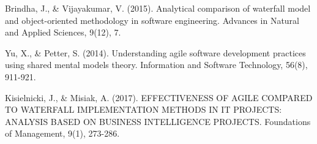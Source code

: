 \documentclass[12pt,a4paper]{article}
\begin{document}
\begin{thebibliography}{9}
  Brindha, J., \& Vijayakumar, V. (2015). Analytical comparison of waterfall model and object-oriented methodology in software engineering. Advances in Natural and Applied Sciences, 9(12), 7.
  
  Yu, X., \& Petter, S. (2014). Understanding agile software development practices using shared mental models theory. Information and Software Technology, 56(8), 911-921.
  
  Kisielnicki, J., \& Misiak, A. (2017). EFFECTIVENESS OF AGILE COMPARED TO WATERFALL IMPLEMENTATION METHODS IN IT PROJECTS: ANALYSIS BASED ON BUSINESS INTELLIGENCE PROJECTS. Foundations of Management, 9(1), 273-286.
\end{thebibliography}
\end{document}
